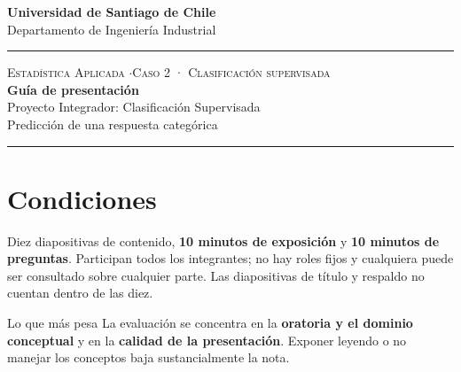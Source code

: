 \documentclass[11pt,letterpaper]{article}
\newcommand{\hrulethin}{\noindent\rule{\textwidth}{0.6pt}}
\begin{document}
\pagestyle{plain}
\begin{center}
    \textbf{\large Universidad de Santiago de Chile}\\[0.1cm]
    Departamento de Ingeniería Industrial
\end{center}
\vspace{0.15cm}\hrulethin\vspace{0.35cm}
\begin{center}
    {\scshape Estadística Aplicada \quad$\cdot$\quad Caso 2 · Clasificación supervisada}\\[0.35cm]
    {\LARGE \textbf{Guía de presentación}}\\[0.15cm]
    {\large Proyecto Integrador: Clasificación Supervisada}\\[0.2cm]
    Predicción de una respuesta categórica
\end{center}
\vspace{0.2cm}\hrulethin\vspace{0.4cm}
\section*{Condiciones}
Diez diapositivas de contenido, \textbf{10 minutos de exposición} y \textbf{10 minutos de preguntas}. Participan
todos los integrantes; no hay roles fijos y cualquiera puede ser consultado sobre cualquier parte. Las
diapositivas de título y respaldo no cuentan dentro de las diez.

\begin{alertbox}{Lo que más pesa}
La evaluación se concentra en la \textbf{oratoria y el dominio conceptual} y en la \textbf{calidad de la presentación}. Exponer leyendo o no manejar los conceptos baja sustancialmente la nota.
\end{alertbox}
\end{document}
